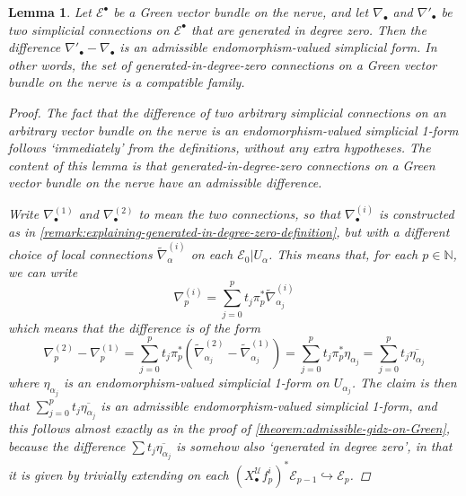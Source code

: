\documentclass[11pt,fleqn]{article}
\theoremstyle{plain}
\newtheorem{lemma}[theorem]{Lemma}
\theoremstyle{definition}
\theoremstyle{remark}
\numberwithin{equation}{theorem}
\newcommand{\cover}{\mathcal{U}}
\newcommand{\restricted}{\mathbin{\big\vert}}
\newcommand{\nerve}[1]{X_{#1}^\cover}
\begin{document}
        \begin{lemma}\label{lemma:green-gidz-compatible-family}
            Let $\mathcal{E}^\bullet$ be a Gre{}en vector bundle on the nerve, and let $\nabla_\bullet$ and $\nabla'_\bullet$ be two simplicial connections on $\mathcal{E}^\bullet$ that are generated in degree zero.
            Then the difference $\nabla'_\bullet-\nabla_\bullet$ is an admissible endomorphism-valued simplicial form.
            In other words, the set of generated-in-degree-zero connections on a Green vector bundle on the nerve is a compatible family.

            \begin{proof}
                The fact that the difference of two arbitrary simplicial connections on an arbitrary vector bundle on the nerve is an endomorphism-valued simplicial 1-form follows `immediately' from the definitions, without any extra hypotheses.
                The content of this lemma is that \emph{generated-in-degree-zero} connections on a \emph{Green} vector bundle on the nerve have an \emph{admissible} difference.

                Write $\nabla_\bullet^{(1)}$ and $\nabla_\bullet^{(2)}$ to mean the two connections, so that $\nabla_\bullet^{(i)}$ is constructed as in \cref{remark:explaining-generated-in-degree-zero-definition}, but with a different choice of local connections $\widetilde{\nabla}_\alpha^{(i)}$ on each $\mathcal{E}_0\restricted U_\alpha$.
                This means that, for each $p\in\mathbb{N}$, we can write
                \begin{equation*}
                    \nabla_p^{(i)}
                    = \sum_{j=0}^p t_j\pi_p^*\widetilde{\nabla}^{(i)}_{\alpha_j}
                \end{equation*}
                which means that the difference is of the form
                \begin{equation*}
                    \nabla_p^{(2)} - \nabla_p^{(1)}
                    = \sum_{j=0}^p t_j \pi_p^* \left(\widetilde{\nabla}^{(2)}_{\alpha_j} - \widetilde{\nabla}^{(1)}_{\alpha_j}\right)
                    = \sum_{j=0}^p t_j \pi_p^* \eta_{\alpha_j}
                    = \sum_{j=0}^p t_j \overline{\eta_{\alpha_j}}
                \end{equation*}
                where $\eta_{\alpha_j}$ is an endomorphism-valued simplicial 1-form on $U_{\alpha_j}$.
                The claim is then that $\sum_{j=0}^p t_j \overline{\eta_{\alpha_j}}$ is an \emph{admissible} endomorphism-valued simplicial 1-form, and this follows almost exactly as in the proof of \cref{theorem:admissible-gidz-on-Green}, because the difference $\sum t_j\overline{\eta_{\alpha_j}}$ is somehow also `generated in degree zero', in that it is given by trivially extending on each $(\nerve{\bullet}f_p^i)^*\mathcal{E}_{p-1}\hookrightarrow\mathcal{E}_p$.
            \end{proof}
        \end{lemma}
\end{document}
